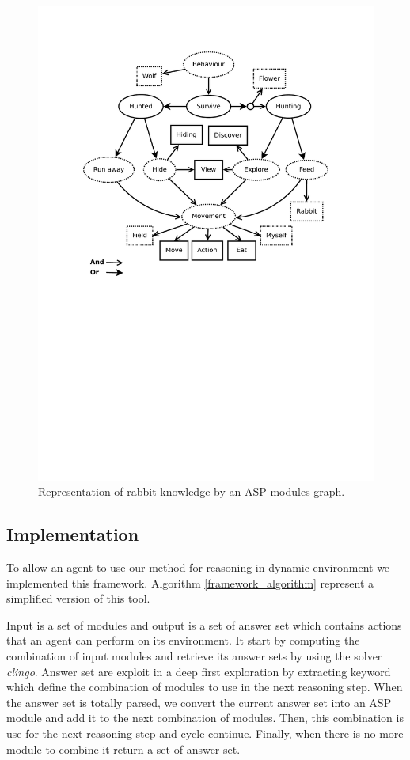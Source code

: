 \documentclass{aamas2012}
\begin{document}
	\begin{figure}
		\centering
		\includegraphics[keepaspectratio=true, scale=0.5]{modular_knowledge.pdf}
		\caption
		{
			\label{modular_knowledge}
			Representation of rabbit knowledge by an ASP modules graph.
		}
	\end{figure}
	
\subsection{Implementation}

	To allow an agent to use our method for reasoning in dynamic environment we implemented this framework.
	Algorithm \ref{framework_algorithm} represent a simplified version of this tool.
	
	Input is a set of modules and output is a set of answer set which contains actions that an agent can perform on its environment.
	It start by computing the combination of input modules and retrieve its answer sets by using the solver \emph{clingo}.
	Answer set are exploit in a deep first exploration by extracting keyword which define the combination of modules to use in the next reasoning step.
	When the answer set is totally parsed, we convert the current answer set into an ASP module and add it to the next combination of modules.
	Then, this combination is use for the next reasoning step and cycle continue.
	Finally, when there is no more module to combine it return a set of answer set.
\end{document}
